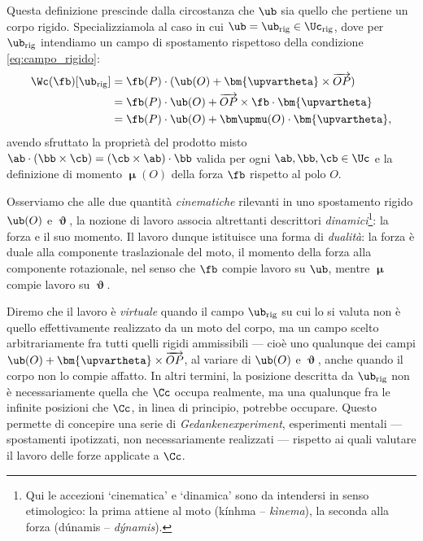 Questa definizione prescinde dalla circostanza che $\ub$ sia quello che pertiene un corpo rigido. Specializziamola al caso in cui $\ub=\ub_{\rm rig}\in\Uc_{\rm rig}$, dove per $\ub_{\rm rig}$
intendiamo un campo di spostamento rispettoso della condizione \eqref{eq:campo_rigido}:
\begin{equation}
\begin{aligned}
		\Wc(\fb)[\ub_{\rm rig}]&=\fb(P)\cdot (\ub(O)+\bm{\upvartheta}\times\overrightarrow{OP})\\
		&=\fb(P)\cdot \ub(O)+\overrightarrow{OP}\times \fb\cdot \bm{\upvartheta}\\
		&=\fb(P)\cdot \ub(O)+\bm\upmu(O)\cdot\bm{\upvartheta},
\end{aligned}
	\end{equation}
avendo sfruttato la proprietà del prodotto misto
$\ab \cdot (\bb \times \cb) = (\cb \times \ab) \cdot \bb$ valida per ogni $\ab, \bb,\cb \in \Uc$ e la definizione di momento $\bm\upmu(O)$ della forza $\fb$ rispetto al polo $O$.

Osserviamo che  alle due quantità \textit{cinematiche} rilevanti in uno spostamento rigido $\ub(O)$ e $\bm\upvartheta$, 
la nozione di lavoro associa altrettanti descrittori  \textit{dinamici}\footnote{Qui le accezioni `cinematica'  e `dinamica' sono da intendersi in senso etimologico: la prima attiene al moto (\textgreek{k\'{i}nhma} -- \textit{kìnema}), la seconda alla forza (\textgreek{d\'{u}namis} -- \textit{d\'{y}namis}). }: la forza e il suo momento. 
Il lavoro dunque istituisce una forma di \textit{dualità}: la forza è duale alla componente traslazionale del moto, il momento della forza alla componente rotazionale, nel senso che $\fb$ compie lavoro su $\ub$, mentre $\bm{\upmu}$ compie lavoro su $\bm{\upvartheta}$. 



Diremo che il lavoro è \textit{virtuale} quando il campo $\ub_{\rm rig}$ su
cui lo si valuta non è quello effettivamente realizzato da un moto del
corpo, ma un campo scelto arbitrariamente fra tutti quelli rigidi
ammissibili --- cioè uno qualunque dei campi $\ub(O)+\bm{\upvartheta}\times
\overrightarrow{OP}$, al variare di $\ub(O)$ e $\bm{\upvartheta}$, anche
quando il corpo non lo compie affatto. In altri termini, la posizione
descritta da $\ub_{\rm rig}$ non è necessariamente quella che $\Cc$ occupa
realmente, ma una qualunque fra le infinite posizioni che $\Cc$, in linea
di principio, potrebbe occupare. Questo permette di concepire una serie
di \textit{Gedankenexperiment}, esperimenti mentali --- spostamenti ipotizzati, non necessariamente
realizzati --- rispetto ai quali valutare il lavoro delle forze applicate
a $\Cc$.

